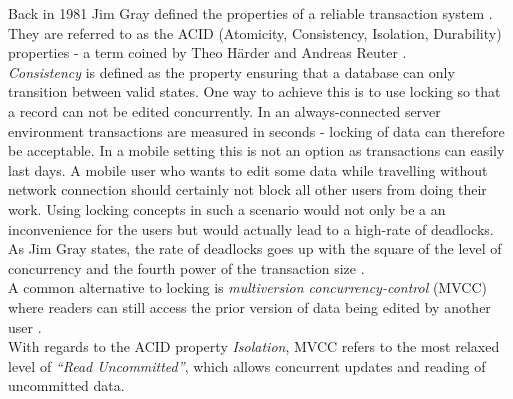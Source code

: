 Back in 1981 Jim Gray defined the properties of a reliable transaction system \cite{Gray:1981wi}.
They are referred to as the ACID (Atomicity, Consistency, Isolation, Durability) properties - a term coined by  Theo Härder and Andreas Reuter \cite{haerder1983principles}.\\
\emph{Consistency} is defined as the property ensuring that a database can only transition between valid states.
One way to achieve this is to use locking so that a record can not be edited concurrently.
In an always-connected server environment transactions are measured in seconds - locking of data can therefore be acceptable.
In a mobile setting this is not an option as transactions can easily last days.
A mobile user who wants to edit some data while travelling without network connection should certainly not block all other users from doing their work.
Using locking concepts in such a scenario would not only be a an inconvenience for the users but would actually lead to a high-rate of deadlocks.
As Jim Gray states, the rate of deadlocks goes up with the square of the level of concurrency and the fourth power of the transaction size \cite{gray1981strawman}.\\
A common alternative to locking is \emph{multiversion concurrency-control} (MVCC) where readers can still access the prior version of data being edited by another user \cite{Bernstein:1981ut}.\\
With regards to the ACID property \emph{Isolation}, MVCC refers to the most relaxed level of \emph{``Read Uncommitted''}, which allows concurrent updates and reading of uncommitted data.\\

